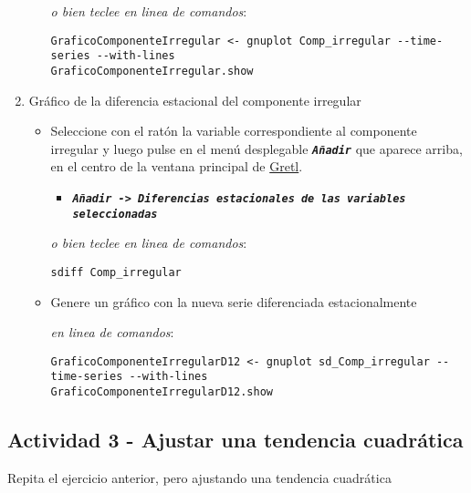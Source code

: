 \documentclass[11pt]{article}
\begin{document}
\begin{enumerate}
\begin{itemize}
{\vspace{1pt} \footnotesize \color{gray!70!black}
\emph{o bien teclee en linea de comandos}:
\begin{verbatim}
GraficoComponenteIrregular <- gnuplot Comp_irregular --time-series --with-lines
GraficoComponenteIrregular.show
\end{verbatim}
}
\end{itemize}

\item Gráfico de la diferencia estacional del componente irregular
\label{sec:orgcb072b9}

\begin{itemize}
\item Seleccione con el ratón la variable correspondiente al componente
irregular y luego pulse en el menú desplegable \textbf{\emph{\texttt{Añadir}}} que
aparece arriba, en el centro de la ventana principal de \href{https://gretl.sourceforge.net/es.html}{Gretl}.
\begin{itemize}
\item \textbf{\emph{\texttt{Añadir -> Diferencias estacionales de las variables
      seleccionadas}}}
\end{itemize}

{\vspace{0pt} \footnotesize \color{gray!70!black}
\emph{o bien teclee en linea de comandos}: 
\begin{verbatim}
sdiff Comp_irregular
\end{verbatim}
}

\item Genere un gráfico con la nueva serie diferenciada estacionalmente

{\vspace{0pt} \footnotesize \color{gray!70!black}
\emph{en linea de comandos}: 
\begin{verbatim}
GraficoComponenteIrregularD12 <- gnuplot sd_Comp_irregular --time-series --with-lines
GraficoComponenteIrregularD12.show
\end{verbatim}
}
\end{itemize}
\end{enumerate}


\subsection{Actividad 3 - Ajustar una tendencia cuadrática}
\label{sec:org9173245}

Repita el ejercicio anterior, pero ajustando una tendencia cuadrática
\end{document}
